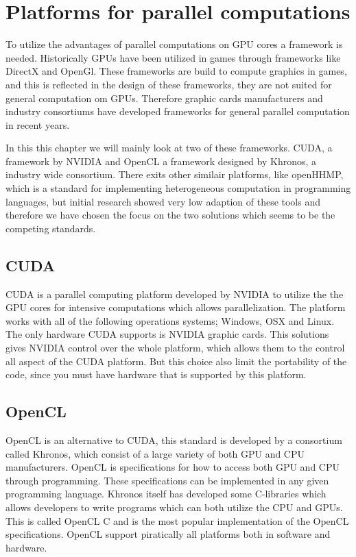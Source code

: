 \section{Platforms for parallel computations}
To utilize the advantages of parallel computations on GPU cores a framework is needed.
Historically GPUs have been utilized in games through frameworks like DirectX and OpenGl.
These frameworks are build to compute graphics in games, and this is reflected in the design of these frameworks, they are not suited for general computation om GPUs.
Therefore graphic cards manufacturers and industry consortiums have developed frameworks for general parallel computation in recent years.

In this this chapter we will mainly look at two of these frameworks.
CUDA, a framework by NVIDIA and OpenCL a framework designed by Khronos, a industry wide consortium.\citep{CUDA, OpenCL}
There exits other similair platforms, like openHHMP, which is a standard for implementing heterogeneous computation in programming languages, but initial research showed very low adaption of these tools and therefore we have chosen the focus on the two solutions which seems to be the competing standards. 

\subsection{CUDA}\label{sec:opencl}
CUDA is a parallel computing platform developed by NVIDIA to utilize the the GPU cores for intensive computations which allows parallelization.
The platform works with all of the following operations systems; Windows, OSX and Linux.
The only hardware CUDA supports is NVIDIA graphic cards. 
This solutions gives NVIDIA control over the whole platform, which allows them to the control all aspect of the CUDA platform.
But this choice also limit the  portability of the code, since you must have hardware that is supported by this platform. \citep{CUDAfaq}

\subsection{OpenCL}
OpenCL is an alternative to CUDA, this standard is developed by a consortium called Khronos, which consist of a large variety of both GPU and CPU manufacturers.
OpenCL is specifications for how to access both GPU and CPU through programming.
These specifications can be implemented in any given programming language.
Khronos itself has developed some C-libraries which allows developers to write programs which can both utilize the CPU and GPUs.
This is called OpenCL C and is the most popular implementation of the OpenCL specifications.
OpenCL support piratically all platforms both in software and hardware. 

